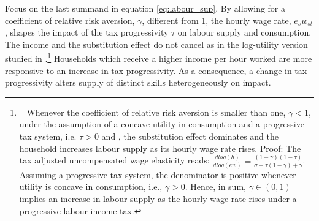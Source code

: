 Focus on the last summand in equation \ref{eq:labour_sup}.
By allowing for a coefficient of relative risk aversion, $\gamma$, different from 1, the hourly wage rate, $e_sw_{st}$, shapes the impact of the tax progressivity $\tau$ on labour supply and consumption. The income and the substitution effect do not cancel as in the log-utility version studied in \cite{Heathcote2017OptimalFramework}.\footnote{\  Whenever the coefficient of relative risk aversion is smaller than one, $\gamma<1$, under the assumption of a concave utility in consumption and a progressive tax system, i.e. $\tau>0$ and ,  the substitution effect dominates and the household 
	increases labour supply as its hourly wage rate rises. Proof: The tax adjusted uncompensated wage elasticity reads: $\frac{d log(h)}{d log(ew)}= \frac{(1-\gamma)(1-\tau)}{\sigma+\tau(1-\gamma)+\gamma}$.  Assuming a progressive tax system, the denominator is positive whenever utility is concave in consumption, i.e., $\gamma>0$. Hence, in sum, $\gamma\in\left(0,1\right)$ implies an increase in labour supply as the hourly wage rate rises under a progressive labour income tax. } 
Households which receive a higher income per hour worked are more responsive to an increase in tax progressivity. As a consequence, a change in tax progressivity alters supply of distinct skills heterogeneously on impact. 
